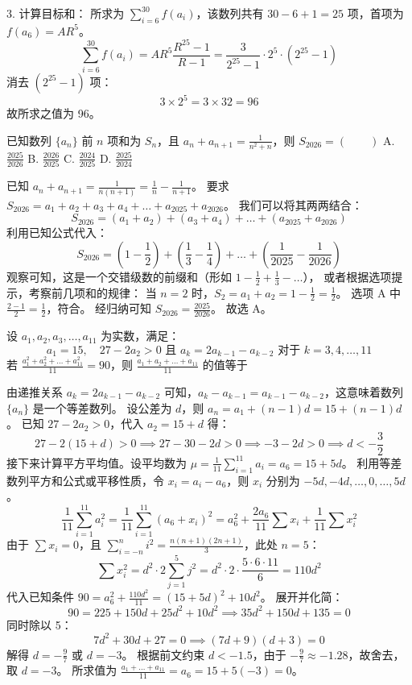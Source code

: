 \begin{questions}
\begin{solution}
    3. 计算目标和：
    所求为 $\sum_{i=6}^{30} f(a_i)$，该数列共有 $30 - 6 + 1 = 25$ 项，首项为 $f(a_6) = AR^5$。
    \[
    \sum_{i=6}^{30} f(a_i) = AR^5 \frac{R^{25} - 1}{R - 1} = \frac{3}{2^{25} - 1} \cdot 2^5 \cdot (2^{25} - 1)
    \]
    消去 $(2^{25} - 1)$ 项：
    \[
    3 \times 2^5 = 3 \times 32 = 96
    \]
    故所求之值为 96。
\end{solution}

\question
已知数列 $\{a_n\}$ 前 $n$ 项和为 $S_n$，且 $a_n + a_{n+1} = \frac{1}{n^2 + n}$，则 $S_{2026} = (\qquad)$
A. $\frac{2025}{2026}$ \quad B. $\frac{2026}{2025}$ \quad C. $\frac{2024}{2025}$ \quad D. $\frac{2025}{2024}$

\begin{solution}
已知 $a_n + a_{n+1} = \frac{1}{n(n+1)} = \frac{1}{n} - \frac{1}{n+1}$。
要求 $S_{2026} = a_1 + a_2 + a_3 + a_4 + \dots + a_{2025} + a_{2026}$。
我们可以将其两两结合：
\[
S_{2026} = (a_1 + a_2) + (a_3 + a_4) + \dots + (a_{2025} + a_{2026})
\]
利用已知公式代入：
\[
S_{2026} = \left( 1 - \frac{1}{2} \right) + \left( \frac{1}{3} - \frac{1}{4} \right) + \dots + \left( \frac{1}{2025} - \frac{1}{2026} \right)
\]
观察可知，这是一个交错级数的前缀和（形如 $1 - \frac{1}{2} + \frac{1}{3} - \dots$），
或者根据选项提示，考察前几项和的规律：
当 $n=2$ 时，$S_2 = a_1 + a_2 = 1 - \frac{1}{2} = \frac{1}{2}$。
选项 A 中 $\frac{2-1}{2} = \frac{1}{2}$，符合。
经归纳可知 $S_{2026} = \frac{2025}{2026}$。
故选 A。
\end{solution}

\question 设 $a_1, a_2, a_3, \dots, a_{11}$ 为实数，满足：
\[
a_1 = 15, \quad 27 - 2a_2 > 0 \text{ 且 } a_k = 2a_{k-1} - a_{k-2} \text{ 对于 } k = 3, 4, \dots, 11
\]
若 $\frac{a_1^2 + a_2^2 + \dots + a_{11}^2}{11} = 90$，则 $\frac{a_1 + a_2 + \dots + a_{11}}{11}$ 的值等于
\begin{solution}
由递推关系 $a_k = 2a_{k-1} - a_{k-2}$ 可知，$a_{k} - a_{k-1} = a_{k-1} - a_{k-2}$，这意味着数列 $\{a_n\}$ 是一个等差数列。
设公差为 $d$，则 $a_n = a_1 + (n-1)d = 15 + (n-1)d$。
已知 $27 - 2a_2 > 0$，代入 $a_2 = 15 + d$ 得：
\[
27 - 2(15 + d) > 0 \implies 27 - 30 - 2d > 0 \implies -3 - 2d > 0 \implies d < -\frac{3}{2}
\]
接下来计算平方平均值。设平均数为 $\mu = \frac{1}{11} \sum_{i=1}^{11} a_i = a_6 = 15 + 5d$。
利用等差数列平方和公式或平移性质，令 $x_i = a_i - a_6$，则 $x_i$ 分别为 $-5d, -4d, \dots, 0, \dots, 5d$。
\[
\frac{1}{11} \sum_{i=1}^{11} a_i^2 = \frac{1}{11} \sum_{i=1}^{11} (a_6 + x_i)^2 = a_6^2 + \frac{2 a_6}{11} \sum x_i + \frac{1}{11} \sum x_i^2
\]
由于 $\sum x_i = 0$，且 $\sum_{i=-n}^n i^2 = \frac{n(n+1)(2n+1)}{3}$，此处 $n=5$：
\[
\sum x_i^2 = d^2 \cdot 2 \sum_{j=1}^5 j^2 = d^2 \cdot 2 \cdot \frac{5 \cdot 6 \cdot 11}{6} = 110d^2
\]
代入已知条件 $90 = a_6^2 + \frac{110d^2}{11} = (15+5d)^2 + 10d^2$。
展开并化简：
\[
90 = 225 + 150d + 25d^2 + 10d^2 \implies 35d^2 + 150d + 135 = 0
\]
同时除以 5：
\[
7d^2 + 30d + 27 = 0 \implies (7d + 9)(d + 3) = 0
\]
解得 $d = -\frac{9}{7}$ 或 $d = -3$。
根据前文约束 $d < -1.5$，由于 $-\frac{9}{7} \approx -1.28$，故舍去，取 $d = -3$。
所求值为 $\frac{a_1 + \dots + a_{11}}{11} = a_6 = 15 + 5(-3) = 0$。
\end{solution}
    

\end{questions}
